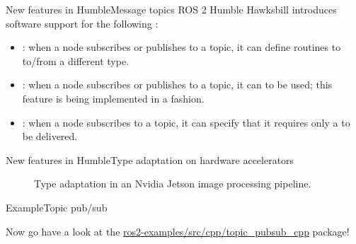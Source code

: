 \begin{frame}{New features in Humble}{Message topics}
  ROS 2 Humble Hawksbill introduces software support for the following :
  \begin{itemize}
    \item \href{https://ros.org/reps/rep-2007.html}{}: when a node subscribes or publishes to a topic, it can define routines to  to/from a different type.
    \item \href{https://github.com/osrf/negotiated}{}: when a node subscribes or publishes to a topic, it can  to be used; this feature is being implemented in a  fashion.
    \item \href{https://github.com/ros2/examples/blob/humble/rclcpp/topics/minimal_subscriber/content_filtering.cpp}{}: when a node subscribes to a topic, it can specify that it requires only a  to be delivered.
  \end{itemize}
\end{frame}
\begin{frame}{New features in Humble}{Type adaptation on hardware accelerators}
  \begin{figure}
    \centering
    \caption{Type adaptation in an Nvidia Jetson image processing pipeline.}
    \label{fig:adaptation}
  \end{figure}
\end{frame}

\begin{frame}{Example}{Topic pub/sub}
  \begin{block}{}
    \centering
	  Now go have a look at the \href{https://github.com/IntelligentSystemsLabUTV/ros2-examples/tree/humble/src/cpp/topic_pubsub_cpp}{\color{blue}\underline{ros2-examples/src/cpp/topic\_pubsub\_cpp}} package!
  \end{block}
\end{frame}

